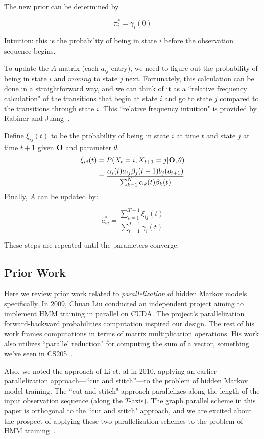 The new prior can be determined by

\begin{equation}\label{pi}
\pi_i^* = \gamma_i(0)
\end{equation}

Intuition: this is the probability of being in state $i$ before the observation sequence begins.  

To update the $A$ matrix (each $a_{ij}$ entry), we need to figure  out the
probability of being in state $i$ and $\textit{moving}$ to state $j$ next.
Fortunately, this calculation can be done in a straightforward way, and we can
think of it as a ``relative frequency calculation" of the transitions that begin
at state $i$ and go to state $j$ compared to the transitions through state $i$.
This ``relative frequency intuition" is provided by Rabiner and Juang~\cite{rabiner1986introduction}.

Define $\xi_{ij}(t)$ to be the probability of being in state $i$ at time $t$ and state $j$ at time $t+1$ given $\bold{O}$ and parameter $\theta$. 
\begin{equation}\label{xi}
\begin{aligned}
\xi_{ij}(t) &= P(X_t = i, X_{t+1} = j | \bold{O}, \theta)  \\
&=\frac{\alpha_i(t) a_{ij} \beta_j(t+1)b_{j}(o_{t+1})}{\sum_{k=1}^N \alpha_k(t) \beta_k(t)}
\end{aligned}
\end{equation}
Finally, $A$ can be updated by: 

\begin{equation}\label{a}
a^*_{ij} = \frac{\sum_{t=1}^{T-1}\xi_{ij}(t)}{\sum_{t=1}^{T-1}\gamma_i(t)}
\end{equation}

These steps are repeated until the parameters converge. 

\subsection{Prior Work}

Here we review prior work related to \textit{parallelization} of hidden Markov
models specifically.  In 2009, Chuan Liu conducted an independent project aiming
to implement HMM training in parallel on CUDA.  The project's parallelization
forward-backward probabilities computation inspired our design.  The rest of his
work frames computations in terms of matrix multiplication operations.  His work
also utilizes ``parallel reduction" for computing the sum of a vector, something
we've seen in CS205~\cite{cuda-hmm}.

Also, we noted the approach of Li et. al in 2010, applying an earlier
parallelization approach---``cut and stitch''---to the problem of hidden Markov
model training.  The ``cut and stitch" approach parallelizes along the length of
the input observation sequence (along the $T$-axis).  The graph parallel scheme
in this paper is orthogonal to the ``cut and stitch" approach, and we are
excited about the prospect of applying these two parallelization schemes to the
problem of HMM training~\cite{cut-stitch}.
